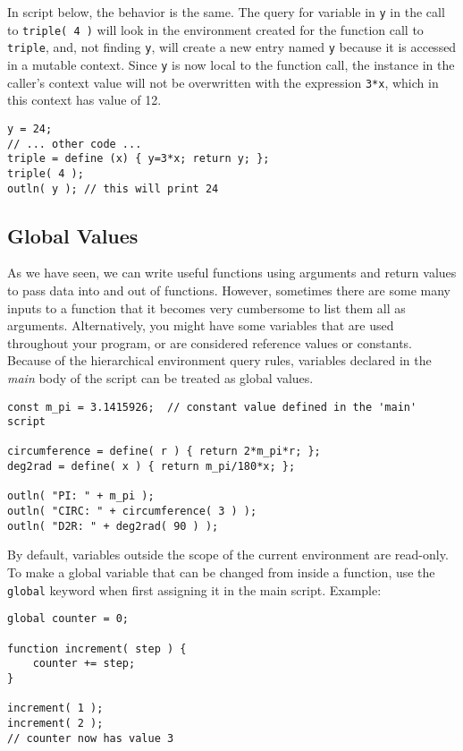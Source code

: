 \documentclass{article}
\begin{document}
In script below, the behavior is the same.  The query for variable in \texttt{y} in the call to \texttt{triple( 4 )} will look in the environment created for the function call to \texttt{triple}, and, not finding \texttt{y}, will create a new entry named \texttt{y} because it is accessed in a mutable context.  Since \texttt{y} is now local to the function call, the instance in the caller's context value will not be overwritten with the expression \texttt{3*x}, which in this context has value of 12.

\begin{verbatim}
y = 24;
// ... other code ...
triple = define (x) { y=3*x; return y; };
triple( 4 );
outln( y ); // this will print 24
\end{verbatim}


\subsection{Global Values}
As we have seen, we can write useful functions using arguments and return values to pass data into and out of functions.  However, sometimes there are some many inputs to a function that it becomes very cumbersome to list them all as arguments.  Alternatively, you might have some variables that are used throughout your program, or are considered reference values or constants.  Because of the hierarchical environment query rules, variables declared in the \emph{main} body of the script can be treated as global values.

\begin{verbatim}
const m_pi = 3.1415926;  // constant value defined in the 'main' script

circumference = define( r ) { return 2*m_pi*r; };
deg2rad = define( x ) { return m_pi/180*x; };

outln( "PI: " + m_pi );
outln( "CIRC: " + circumference( 3 ) );
outln( "D2R: " + deg2rad( 90 ) );
\end{verbatim}

By default, variables outside the scope of the current environment are read-only.  To make a global variable that can be changed from inside a function, use the \texttt{global} keyword when first assigning it in the main script. Example:

\begin{verbatim}
global counter = 0;

function increment( step ) {
	counter += step;
}

increment( 1 );
increment( 2 );
// counter now has value 3
\end{verbatim}
\end{document}
